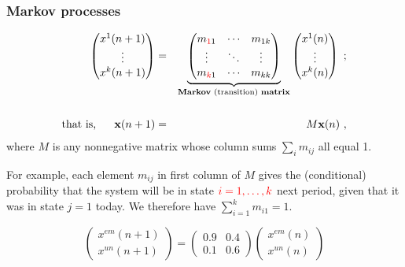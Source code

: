 \documentclass[10pt, handout]{beamer}
\begin{document}
\begin{frame}
\frametitle{Markov processes} \vskip0.1in

\begin{eqnarray}\label{markov}
\begin{pmatrix}
x^1(n+1) \\ \vdots \\ x^k(n+1)
\end{pmatrix} &=& \underset{\text{\textbf{Markov} (transition) \textbf{matrix}}}{\underbrace{\begin{pmatrix}
m_{{\color{red}1}1} & \cdots & m_{1k} \\
\vdots & \ddots & \vdots \\
m_{{\color{red}k}1} & \cdots & m_{kk} 
\end{pmatrix}}} \begin{pmatrix}
x^1(n) \\ \vdots \\ x^k(n)
\end{pmatrix} ~; \\ \nonumber  \\ \nonumber 
{\text{that is,~~~~~\hfill}}\mathbf{x}(n+1) &=& M\mathbf{x}(n)~,
\end{eqnarray}
where $M$ is any nonnegative matrix whose column sums $\sum_i m_{ij}$ all equal 1.\vskip0.1in

For example, each element $m_{ij}$ in first column of $M$ gives the (conditional) probability that the system will be in state ${\color{red}i=1,\ldots,k}$ next period, given that it was in state $j=1$ today. We therefore have $\sum_{i=1}^{k} m_{i1} = 1$.

\begin{example}[23.20, p. 617]
$$\begin{pmatrix}
x^{em}(n+1) \\ x^{un}(n+1)
\end{pmatrix} = \begin{pmatrix}
0.9 & 0.4 \\ 0.1 & 0.6
\end{pmatrix} \begin{pmatrix}
x^{em}(n) \\ x^{un}(n)
\end{pmatrix} $$
\end{example}

\end{frame}
\end{document}
